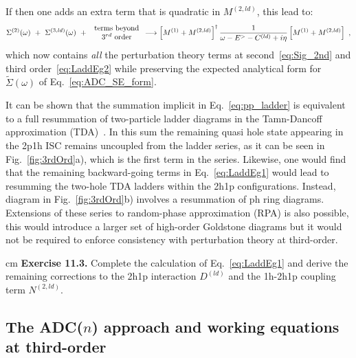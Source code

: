 If then one adds an extra term that is quadratic in  $M^{(2,ld)}$, this lead to:
\begin{equation}
  \Sigma^{(2)}(\omega)  ~+~ \Sigma^{(3, ld)}(\omega) ~+~ \begin{array}{c} \hbox{terms beyond} \\ \hbox{ 3$^{rd}$ order } \end{array} 
 \longrightarrow  \left[ M^{(1)} +  M^{(2,ld)}\right]^\dagger \frac1{\omega  - E^> - C^{(ld)} + i\eta}\left[ M^{(1)} + M^{(2,ld)}\right]  \ ,
 \label{eq:pp_ladder}
\end{equation}
which now contains {\em all}  the perturbation theory terms at second~\eqref{eq:Sig_2nd} and third order~\eqref{eq:LaddEg2} while preserving the expected analytical form for~$\widetilde\Sigma(\omega)$ of Eq.~\eqref{eq:ADC_SE_form}.

It can be shown that the summation implicit in Eq.~\eqref{eq:pp_ladder} is equivalent to a full resummation of two-particle ladder diagrams in the Tamn-Dancoff approximation (TDA)~\cite{ch11_RingSchuck}. In this sum the remaining quasi hole state appearing in the 2p1h ISC remains uncoupled from the ladder series, as it can be seen in Fig.~\ref{fig:3rdOrd}a), which is the first term in the series.  Likewise, one would find that the remaining backward-going terms in Eq.~\eqref{eq:LaddEg1} would lead to resumming the two-hole TDA ladders within the 2h1p configurations. Instead, diagram in Fig.~\ref{fig:3rdOrd}b) involves a resummation of ph ring diagrams. Extensions of these series to random-phase approximation (RPA) is also possible, this would introduce a larger set of high-order Goldstone diagrams but it would not be required to enforce consistency with perturbation theory at third-order.

 cm
\noindent
{\bf Exercise 11.3.}  Complete  the calculation of Eq.~\eqref{eq:LaddEg1} and derive the remaining corrections to the 2h1p interaction $D^{(ld)}$  and the 1h-2h1p coupling term  $N^{(2,ld)}$.


\subsection{The \texorpdfstring{ADC($n$)}{ADC(n)} approach and working equations at third-order}

